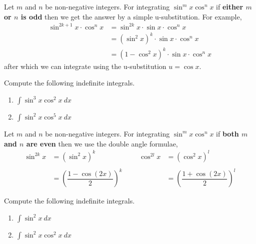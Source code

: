 Let $m$ and $n$ be non-negative integers.
For integrating $\sin^ m x \cos^n x$ if
	{\bf either $m$ or $n$ is odd}
then we get the answer by a simple u-substitution. For example,
\begin{align*}
	\sin^ {2k+1} x \cdot \cos^n x
	 & = \sin^ {2k} x \cdot  \sin x \cdot  \cos^n x                 \\
	 & = \left( \sin^2 x \right)^k \cdot \sin x \cdot \cos^n x      \\
	 & = \left( 1 - \cos^2 x \right)^k \cdot \sin x \cdot  \cos^n x
\end{align*}
after which we can integrate using the u-substitution $ u = \cos x$.
\begin{exercise}
	Compute the following indefinite integrals.
	\begin{multicols}{2}
		\begin{enumerate}
			\item $\int \sin^3 x \cos^2 x \: dx$
			\item $\int \sin^2 x \cos^5 x \: dx$
		\end{enumerate}
	\end{multicols}
\end{exercise}

Let $m$ and $n$ be non-negative integers.
For integrating $\sin^ m x \cos^n x$ if
	{\bf both $m$ and $n$ are even}
then we use the double angle formulae,
\begin{align*}
	\sin^ {2k} x
	 & = \left(\sin^{2} x \right)^k
	 &                                           &  &
	\cos^ {2l} x
	 & = \left(\cos^{2} x \right)^l                   \\
	\\
	 & = \left(\dfrac{1 - \cos(2x)}{2} \right)^k
	 &                                           &  &
	 & = \left(\dfrac{1 + \cos(2x)}{2} \right)^l
\end{align*}
\begin{exercise}
	Compute the following indefinite integrals.
	\begin{multicols}{2}
		\begin{enumerate}
			\item $\int \sin^2 x \: dx $
			\item $\int \sin^2 x \cos^2 x \: dx$
		\end{enumerate}
	\end{multicols}
\end{exercise}


